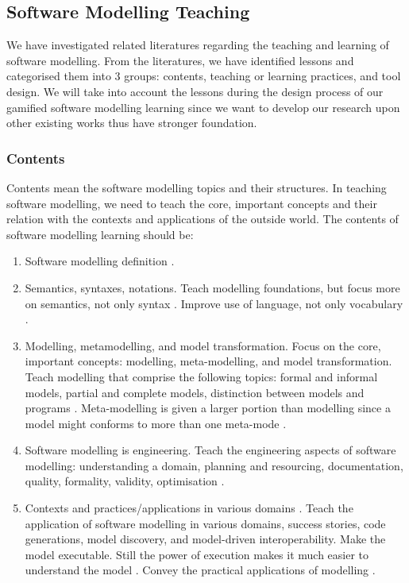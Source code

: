 \documentclass[12pt, a4paper]{report}
\begin{document}
\subsection{Software Modelling Teaching}
We have investigated related literatures regarding the teaching and learning of software modelling.  From the literatures, we have identified lessons and categorised them into 3 groups: contents, teaching or learning practices, and tool design. We will take into account the lessons during the design process of our gamified software modelling learning since we want to develop our research upon other existing works thus have stronger foundation.   

\subsubsection{Contents}
Contents mean the software modelling topics and their structures. In teaching software modelling, we need to teach the core, important concepts and their relation with the contexts and applications of the outside world. The contents of software modelling learning should be:
\begin{enumerate}
\item Software modelling definition \cite{borstler2012teaching}.
\item Semantics, syntaxes, notations. Teach modelling foundations, but focus more on semantics, not only syntax \cite{borstler2012teaching}. Improve use of language, not only vocabulary \cite{bezivin2009teaching}.
\item Modelling, metamodelling, and model transformation. Focus on the core, important concepts: modelling, meta-modelling, and model transformation. Teach modelling that comprise the following topics: formal and informal models, partial and complete models, distinction between models and programs \cite{bezivin2009teaching}. Meta-modelling is given a larger portion than modelling since a model might conforms to more than one meta-mode \cite{ober2007teaching}.
\item Software modelling is engineering. Teach the engineering aspects of software modelling: understanding a domain, planning and resourcing, documentation, quality, formality, validity, optimisation \cite{paige2014bad}.
\item Contexts and practices/applications in various domains \cite{paige2014bad}. Teach the application of software modelling in various domains, success stories, code generations, model discovery, and model-driven interoperability. Make the model executable. Still the power of execution makes it much easier to understand the model \cite{bezivin2009teaching}. Convey the practical applications of modelling \cite{borstler2012teaching}.
\end{enumerate}
\end{document}
